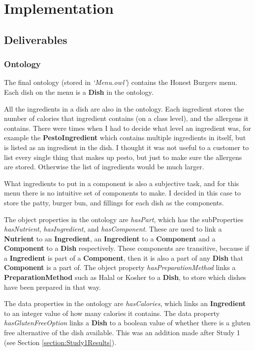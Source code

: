\chapter{Implementation}

\section{Deliverables}

\subsection{Ontology}

The final ontology (stored in \textit{`Menu.owl'}) contains the Honest Burgers \cite{honest_burgers_2023} menu. Each dish on the menu is a \textbf{Dish} in the ontology.

All the ingredients in a dish are also in the ontology. Each ingredient stores the number of calories that ingredient contains (on a class level), and the allergens it contains. There were times when I had to decide what level an ingredient was, for example the \textbf{PestoIngredient} which contains multiple ingredients in itself, but is listed as an ingredient in the dish. I thought it was not useful to a customer to list every single thing that makes up pesto, but just to make sure the allergens are stored. Otherwise the list of ingredients would be much larger.

What ingredients to put in a component is also a subjective task, and for this menu there is no intuitive set of components to make. I decided in this case to store the patty, burger bun, and fillings for each dish as the components.

The object properties in the ontology are \textit{hasPart}, which has the subProperties \textit{hasNutrient}, \textit{hasIngredient}, and \textit{hasComponent}. These are used to link a \textbf{Nutrient} to an \textbf{Ingredient}, an \textbf{Ingredient} to a \textbf{Component} and a \textbf{Component} to a \textbf{Dish} respectively. These components are transitive, because if a \textbf{Ingredient} is part of a \textbf{Component}, then it is also a part of any \textbf{Dish} that \textbf{Component} is a part of. The object property \textit{hasPreparationMethod} links a \textbf{PreparationMethod} such as Halal or Kosher to a \textbf{Dish}, to store which dishes have been prepared in that way.

The data properties in the ontology are \textit{hasCalories}, which links an \textbf{Ingredient} to an integer value of how many calories it contains. The data property \textit{hasGlutenFreeOption} links a \textbf{Dish} to a boolean value of whether there is a gluten free alternative of the dish available. This was an addition made after Study 1 (see Section \ref{section:Study1Results}).

